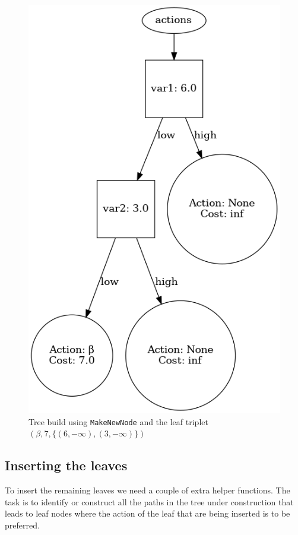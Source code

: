 \documentclass{article}
\begin{document}
\begin{figure}[ht]
    \centering
    \includegraphics[scale=0.4]{exampleRoot}
    \caption{%
        Tree build using \texttt{MakeNewNode} and the leaf triplet $(\beta, 7,
        \{ (6, -\infty), (3, -\infty) \})$ 
    }\label{fig:rootTree}
\end{figure}

\subsection{Inserting the leaves}

To insert the remaining leaves we need a couple of extra helper functions. The
task is to identify or construct all the paths in the tree under construction
that leads to leaf nodes where the action of the leaf that are being inserted is
to be preferred.
\end{document}
